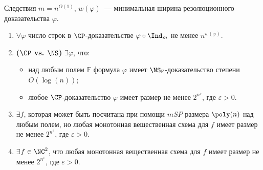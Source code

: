 \newcommand{\ba}{{\color{blue} $\boldsymbol{\forall}$}}
\newcommand{\be}{{\color{blue} $\boldsymbol{\exists}$}}

\begin{frame}{Следствия}
    $m = n^{O(1)}$, $w(\varphi)$~--- минимальная ширина резолюционного доказательства $\varphi$.

    \pause
    \begin{enumerate}
        \item \ba $\varphi$ число строк в $\CP$-доказательстве $\varphi \circ \Ind_m$ не менее
            $n^{w(\varphi)}$.
        \pause
        \item \textbf{($\CP$ vs. $\NS$)} \be $\varphi$, что:
            \begin{itemize}
                \item над любым полем $\mathbb{F}$ формула $\varphi$ имеет
                    $\NS_{\mathbb{F}}$-доказательство степени $O(\log(n))$;
                \item любое $\CP$-доказательство $\varphi$ имеет размер не менее $2^{n^{\varepsilon}}$,
                    где $\varepsilon > 0$.
            \end{itemize}
        \pause
        \vspace{0.2cm}
        \item \be $f$, которая может быть посчитана при помощи $mSP$ размера $\poly(n)$ над любым полем,
            но любая монотонная вещественная схема для $f$ имеет размер не менее $2^{n^{\varepsilon}}$,
            где $\varepsilon > 0$.
        \pause
        \item \be $f \in \NC^2$, что любая монотонная вещественная схема для $f$ имеет размер не менее
            $2^{n^{\varepsilon}}$, где $\varepsilon > 0$.
    \end{enumerate}
\end{frame}
